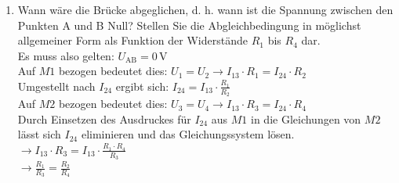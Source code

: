 {\begin{enumerate}[label=\alph*)]
        Kontrolle mit Masche $M2$:\\

        $M2: U_\mathrm{AB} + U_4 - U_2 = 0$\\
        $\rightarrow U_\mathrm{AB} = U_3 - U_4 = 14,4 \, \mathrm{V} - 12 \, \mathrm{V} = 2,4 \mathrm{V}$\\

        \item Wann wäre die Brücke abgeglichen, d. h. wann ist die Spannung zwischen den Punkten A und B Null?
        Stellen Sie die Abgleichbedingung in möglichst allgemeiner Form als Funktion der Widerstände $R_1$ bis $R_4$ dar. \\

        Es muss also gelten: $U_\mathrm{AB} = 0 \, \mathrm{V}$\\

        Auf $M1$ bezogen bedeutet dies: $U_1 = U_2 \rightarrow I_{13} \cdot R_1 = I_{24} \cdot R_2$\\
        Umgestellt nach $I_{24}$ ergibt sich: $I_{24} = I_{13} \cdot \frac{R_1}{R_2}$\\

        Auf $M2$ bezogen bedeutet dies: $U_3 = U_4 \rightarrow I_{13} \cdot R_3 = I_{24} \cdot R_4$\\

        Durch Einsetzen des Ausdruckes für $I_{24}$ aus $M1$ in die Gleichungen von $M2$ lässt sich $I_{24}$ eliminieren und das Gleichungssystem lösen.\\

        $\rightarrow I_{13} \cdot R_3 = I_{13} \cdot \frac{R_1 \cdot R_4}{R_3}$\\

        $\rightarrow \frac{R_1}{R_3} = \frac{R_2}{R_4}$
 
    


        
        
    \end{enumerate}
    \begin{center}
        
   
   
\end{center}
}